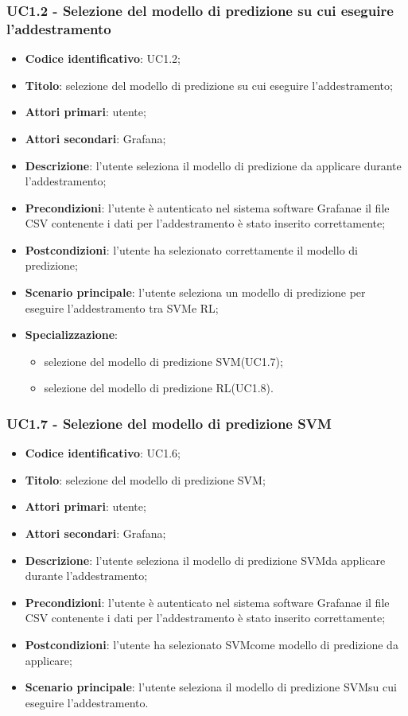 \subsubsection{UC1.2 - Selezione del modello di predizione su cui eseguire l'addestramento}
\begin{itemize}
	\item \textbf{Codice identificativo}: UC1.2;
	\item \textbf{Titolo}: selezione del modello di predizione su cui eseguire l'addestramento;
	\item \textbf{Attori primari}: utente;
	\item \textbf{Attori secondari}: Grafana\glo;
	\item \textbf{Descrizione}: l'utente seleziona il modello di predizione da applicare durante l'addestramento;
	\item \textbf{Precondizioni}: l'utente è autenticato nel sistema software Grafana\glosp e il file CSV contenente i dati per l'addestramento è stato inserito correttamente;
	\item \textbf{Postcondizioni}: l'utente ha selezionato correttamente il modello di predizione;
	\item \textbf{Scenario principale}: l'utente seleziona un modello di predizione per eseguire l'addestramento tra SVM\glosp e RL\glo;
	\item \textbf{Specializzazione}:
	\begin{itemize}
		\item selezione del modello di predizione SVM\glosp (UC1.7);
		\item selezione del modello di predizione RL\glosp (UC1.8).
	\end{itemize}
\end{itemize}
\subsubsection{UC1.7 - Selezione del modello di predizione SVM}
\begin{itemize}
	\item \textbf{Codice identificativo}: UC1.6;
	\item \textbf{Titolo}: selezione del modello di predizione SVM\glo;
	\item \textbf{Attori primari}: utente;
	\item \textbf{Attori secondari}: Grafana\glo;
	\item \textbf{Descrizione}: l'utente seleziona il modello di predizione SVM\glosp da applicare durante l'addestramento;
	\item \textbf{Precondizioni}: l'utente è autenticato nel sistema software Grafana\glosp e il file CSV contenente i dati per l'addestramento è stato inserito correttamente;
	\item \textbf{Postcondizioni}: l'utente ha selezionato SVM\glosp come modello di predizione da applicare;
	\item \textbf{Scenario principale}: l'utente seleziona il modello di predizione SVM\glosp su cui eseguire l'addestramento.
\end{itemize}
